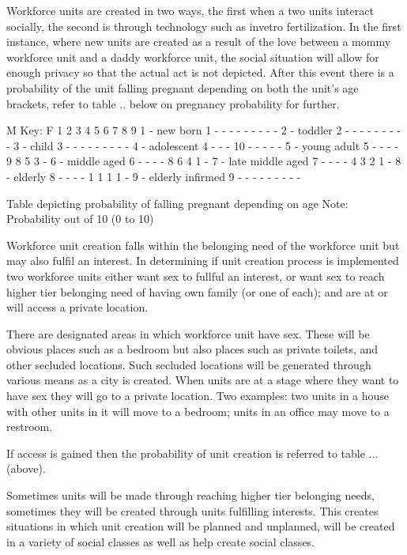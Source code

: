 Workforce units are created in two ways, the first when a two units interact socially, the second is through technology such as invetro fertilization. In the first instance, where new units are created as a result of the love between a mommy workforce unit and a daddy workforce unit, the social situation will allow for enough privacy so that the actual act is not depicted. After this event there is a probability of the unit falling pregnant depending on both the unit's age brackets, refer to table .. below on pregnancy probability for further. 

  M			        Key:
F 1  2  3  4  5  6  7  8  9     1 - new born
1 -  -  -  -  -  -  -  -  -     2 - toddler
2 -  -  -  -  -  -  -  -  -     3 - child
3 -  -  -  -  -  -  -  -  -     4 - adolescent
4 -  -  - 10  -  -  -  -  -     5 - young adult
5 -  -  -  -  9  8  5  3  -     6 - middle aged
6 -  -  -  -  8  6  4  1  -     7 - late middle aged
7 -  -  -  -  4  3  2  1  -     8 - elderly 
8 -  -  -  -  1  1  1  1  -     9 - elderly infirmed
9 -  -  -  -  -  -  -  -  -     

Table depicting probability of falling pregnant depending on age
Note: Probability out of 10 (0 to 10)

Workforce unit creation falls within the belonging need of the workforce unit but may also fulfil an interest. In determining if unit creation process is implemented two workforce units either want sex to fullful an interest, or want sex to reach higher tier belonging need of having own family (or one of each); and are at or will access a private location.

There are designated areas in which workforce unit have sex. These will be obvious places such as a bedroom but also places such as private toilets, and other secluded locations. Such secluded locations will be generated through various means as a city is created. When units are at a stage where they want to have sex they will go to a private location. Two examples: two units in a house with other units in it will move to a bedroom; units in an office may move to a restroom. 

If access is gained then the probability of unit creation is referred to table ... (above).

Sometimes units will be made through reaching higher tier belonging needs, sometimes they will be created through units fulfilling interests. This creates situations in which unit creation will be planned and unplanned, will be created in a variety of social classes as well as help create social classes.

